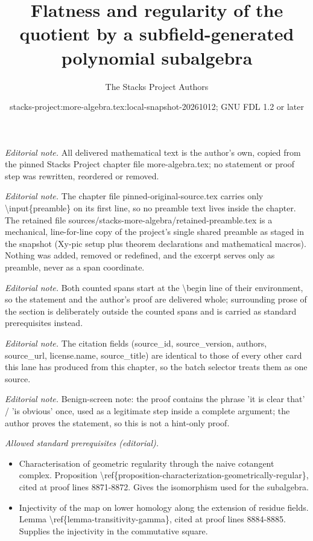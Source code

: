 \documentclass[10pt,a4paper]{amsart}
\title{Flatness and regularity of the quotient by a subfield-generated polynomial subalgebra}
\author{The Stacks Project Authors}
\date{stacks-project:more-algebra.tex:local-snapshot-20261012; GNU FDL 1.2 or later}
\theoremstyle{plain}
\theoremstyle{definition}
\theoremstyle{remark}
\numberwithin{equation}{subsection}
\begin{document}
\maketitle
\setcounter{subsection}{1}
\noindent\textit{Editorial note.} All delivered mathematical text is the author's own, copied from the pinned Stacks Project chapter file more-algebra.tex; no statement or proof step was rewritten, reordered or removed.\par\medskip
\noindent\textit{Editorial note.} The chapter file pinned-original-source.tex carries only \textbackslash{}input\{preamble\} on its first line, so no preamble text lives inside the chapter. The retained file sources/stacks-more-algebra/retained-preamble.tex is a mechanical, line-for-line copy of the project's single shared preamble as staged in the snapshot (Xy-pic setup plus theorem declarations and mathematical macros). Nothing was added, removed or redefined, and the excerpt serves only as preamble, never as a span coordinate.\par\medskip
\noindent\textit{Editorial note.} Both counted spans start at the \textbackslash{}begin line of their environment, so the statement and the author's proof are delivered whole; surrounding prose of the section is deliberately outside the counted spans and is carried as standard prerequisites instead.\par\medskip
\noindent\textit{Editorial note.} The citation fields (source\_id, source\_version, authors, source\_url, license.name, source\_title) are identical to those of every other card this lane has produced from this chapter, so the batch selector treats them as one source.\par\medskip
\noindent\textit{Editorial note.} Benign-screen note: the proof contains the phrase 'it is clear that' / 'is obvious' once, used as a legitimate step inside a complete argument; the author proves the statement, so this is not a hint-only proof.\par\medskip
\noindent\textit{Allowed standard prerequisites (editorial).}\begin{itemize}
\item Characterisation of geometric regularity through the naive cotangent complex. Proposition \textbackslash{}ref\{proposition-characterization-geometrically-regular\}, cited at proof lines 8871-8872. Gives the isomorphism used for the subalgebra.
\item Injectivity of the map on lower homology along the extension of residue fields. Lemma \textbackslash{}ref\{lemma-transitivity-gamma\}, cited at proof lines 8884-8885. Supplies the injectivity in the commutative square.
\end{itemize}\medskip
\end{document}
